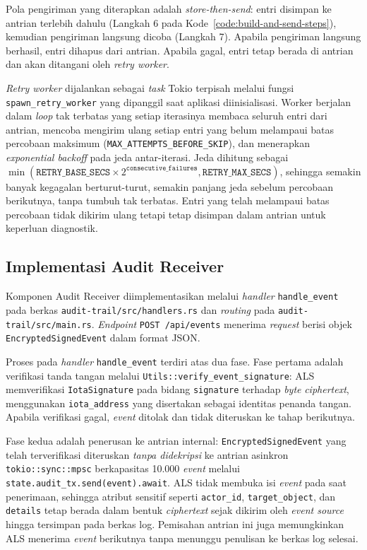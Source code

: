 Pola pengiriman yang diterapkan adalah \textit{store-then-send}: entri disimpan
ke antrian terlebih dahulu (Langkah 6 pada Kode~\ref{code:build-and-send-steps}),
kemudian pengiriman langsung dicoba (Langkah 7). Apabila pengiriman langsung
berhasil, entri dihapus dari antrian. Apabila gagal, entri tetap berada di
antrian dan akan ditangani oleh \textit{retry worker}.

\textit{Retry worker} dijalankan sebagai \textit{task} Tokio terpisah melalui
fungsi \texttt{spawn\_retry\_worker} yang dipanggil saat aplikasi diinisialisasi.
Worker berjalan dalam \textit{loop} tak terbatas yang setiap iterasinya membaca
seluruh entri dari antrian, mencoba mengirim ulang setiap entri yang belum
melampaui batas percobaan maksimum (\texttt{MAX\_ATTEMPTS\_BEFORE\_SKIP}), dan
menerapkan \textit{exponential backoff} pada jeda antar-iterasi. Jeda dihitung
sebagai $\min(\texttt{RETRY\_BASE\_SECS} \times 2^{\texttt{consecutive\_failures}},
\texttt{RETRY\_MAX\_SECS})$, sehingga semakin banyak kegagalan berturut-turut,
semakin panjang jeda sebelum percobaan berikutnya, tanpa tumbuh tak terbatas.
Entri yang telah melampaui batas percobaan tidak dikirim ulang tetapi tetap
disimpan dalam antrian untuk keperluan diagnostik.

\subsection{Implementasi Audit Receiver}
 
Komponen Audit Receiver diimplementasikan melalui \textit{handler}
\texttt{handle\_event} pada berkas \texttt{audit-trail/src/handlers.rs}
dan \textit{routing} pada \texttt{audit-trail/src/main.rs}. \textit{Endpoint}
\texttt{POST /api/events} menerima \textit{request} berisi objek
\texttt{EncryptedSignedEvent} dalam format JSON.
 
Proses pada \textit{handler} \texttt{handle\_event} terdiri atas dua fase.
Fase pertama adalah verifikasi tanda tangan melalui
\texttt{Utils::verify\_event\_signature}: ALS memverifikasi
\texttt{IotaSignature} pada bidang \texttt{signature} terhadap \textit{byte}
\textit{ciphertext}, menggunakan \texttt{iota\_address} yang disertakan sebagai
identitas penanda tangan. Apabila verifikasi gagal, \textit{event} ditolak dan
tidak diteruskan ke tahap berikutnya.
 
Fase kedua adalah penerusan ke antrian internal: \texttt{EncryptedSignedEvent}
yang telah terverifikasi diteruskan \emph{tanpa didekripsi} ke antrian asinkron
\texttt{tokio::sync::mpsc} berkapasitas 10.000 \textit{event} melalui
\texttt{state.audit\_tx.send(event).await}. ALS tidak membuka isi \textit{event}
pada saat penerimaan, sehingga atribut sensitif seperti \texttt{actor\_id},
\texttt{target\_object}, dan \texttt{details} tetap berada dalam bentuk
\textit{ciphertext} sejak dikirim oleh \textit{event source} hingga tersimpan
pada berkas log. Pemisahan antrian ini juga memungkinkan ALS menerima
\textit{event} berikutnya tanpa menunggu penulisan ke berkas log selesai.

